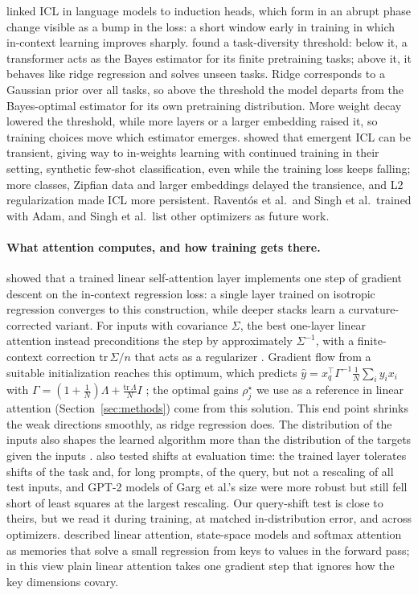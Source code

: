 \citet{olsson2022} linked ICL in language models to induction heads, which form in an abrupt phase change visible as a bump in the loss: a short window early in training in which in-context learning improves sharply. \citet{raventos2023} found a task-diversity threshold: below it, a transformer acts as the Bayes estimator for its finite pretraining tasks; above it, it behaves like ridge regression and solves unseen tasks. Ridge corresponds to a Gaussian prior over all tasks, so above the threshold the model departs from the Bayes-optimal estimator for its own pretraining distribution. More weight decay lowered the threshold, while more layers or a larger embedding raised it, so training choices move which estimator emerges. \citet{singh2023} showed that emergent ICL can be transient, giving way to in-weights learning with continued training in their setting, synthetic few-shot classification, even while the training loss keeps falling; more classes, Zipfian data and larger embeddings delayed the transience, and L2 regularization made ICL more persistent. Raventós et al.\ and Singh et al.\ trained with Adam, and Singh et al.\ list other optimizers as future work.

\paragraph{What attention computes, and how training gets there.} \citet{vonoswald2023} showed that a trained linear self-attention layer implements one step of gradient descent on the in-context regression loss: a single layer trained on isotropic regression converges to this construction, while deeper stacks learn a curvature-corrected variant. For inputs with covariance $\Sigma$, the best one-layer linear attention instead preconditions the step by approximately $\Sigma^{-1}$, with a finite-context correction $\mathrm{tr}\,\Sigma/n$ that acts as a regularizer \citep{ahn2023}. Gradient flow from a suitable initialization reaches this optimum, which predicts $\hat y = x_q^\top \Gamma^{-1} \frac1N\sum_i y_i x_i$ with $\Gamma = (1+\frac1N)\Lambda + \frac{\mathrm{tr}\,\Lambda}{N} I$ \citep{zhang2023trained}; the optimal gains $\rho_j^\star$ we use as a reference in linear attention (Section~\ref{sec:methods}) come from this solution. This end point shrinks the weak directions smoothly, as ridge regression does. The distribution of the inputs also shapes the learned algorithm more than the distribution of the targets given the inputs \citep{mahankali2023}. \citet{zhang2023trained} also tested shifts at evaluation time: the trained layer tolerates shifts of the task and, for long prompts, of the query, but not a rescaling of all test inputs, and GPT-2 models of Garg et al.'s size were more robust but still fell short of least squares at the largest rescaling. Our query-shift test is close to theirs, but we read it during training, at matched in-distribution error, and across optimizers. \citet{wang2025testtime} described linear attention, state-space models and softmax attention as memories that solve a small regression from keys to values in the forward pass; in this view plain linear attention takes one gradient step that ignores how the key dimensions covary.

